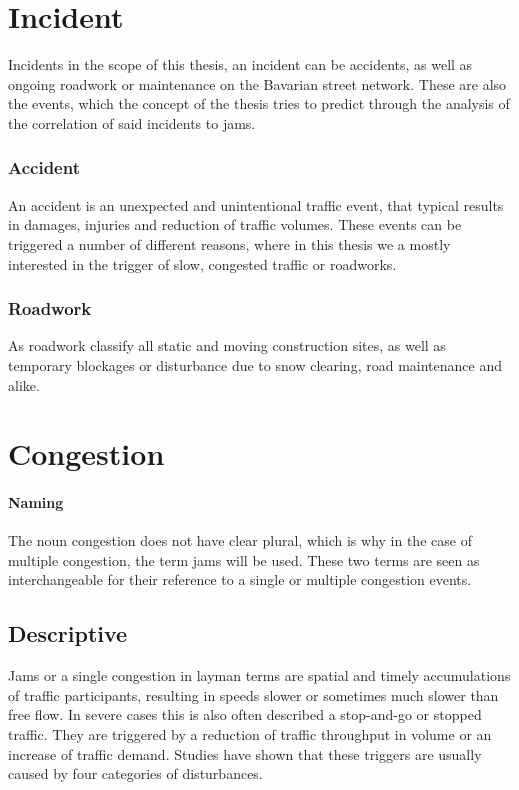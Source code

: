 \documentclass[a4paper,12pt]{report}
\begin{document}
\section{Incident}
		Incidents in the scope of this thesis, an incident can be accidents, as well as ongoing roadwork or maintenance on the Bavarian street network. These are also the events, which the concept of the thesis tries to predict through the analysis of the correlation of said incidents to jams.
	\subsubsection{Accident}
		An accident is an unexpected and unintentional traffic event, that typical results in damages, injuries and reduction of traffic volumes. These events can be triggered a number of different reasons, where in this thesis we a mostly interested in the trigger of slow, congested traffic or roadworks.
	\subsubsection{Roadwork}
		As roadwork classify all static and moving construction sites, as well as temporary blockages or disturbance due to snow clearing, road maintenance and alike. 
	
\section{Congestion}
\label{definition_congestion}

\paragraph{Naming} The noun congestion does not have clear plural, which is why in the case of multiple congestion, the term jams will be used. These two terms are seen as interchangeable for their reference to a single or multiple congestion events.

\subsection{Descriptive}

Jams or a single congestion in layman terms are spatial and timely accumulations of traffic participants, resulting in speeds slower or sometimes much slower than free flow. In severe cases this is also often described a stop-and-go or stopped traffic. They are triggered by a reduction of traffic throughput in volume or an increase of traffic demand. Studies have shown that these triggers are usually caused by four categories of disturbances. \cite{TRB2003,FHA2011}
\end{document}
